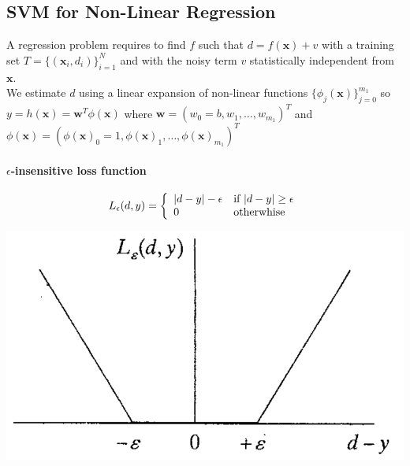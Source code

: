 \documentclass[10pt]{report}
\begin{document}
\subsection{SVM for Non-Linear Regression}
A regression problem requires to find $f$ such that $d=f(\mathbf{x})+v$ with a training set $T=\{(\mathbf{x}_i,d_i)\}_{i=1}^N$ and with the noisy term $v$ statistically independent from $\mathbf{x}$.\\
We estimate $d$ using a linear expansion of non-linear functions $\{\phi_j(\mathbf{x})\}_{j=0}^{m_1}$ so $y=h(\mathbf{x}) = \mathbf{w}^T\phi(\mathbf{x})$ where $\mathbf{w} = (w_0 = b, w_1,\ldots,w_{m_1})^T$ and $\phi(\mathbf{x}) = (\phi(\mathbf{x})_0 = 1, \phi(\mathbf{x})_1,\ldots, \phi(\mathbf{x})_{m_1})^T$
\paragraph{$\epsilon$-insensitive loss function} $$L_\epsilon(d,y) = \left\{\begin{array}{l l}
|d - y| - \epsilon & \text{if }|d-y|\geq\epsilon\\
0 & \text{otherwhise}
\end{array} \right.$$
\begin{center}
	\includegraphics[scale=0.5]{22.png}
\end{center}
\end{document}
